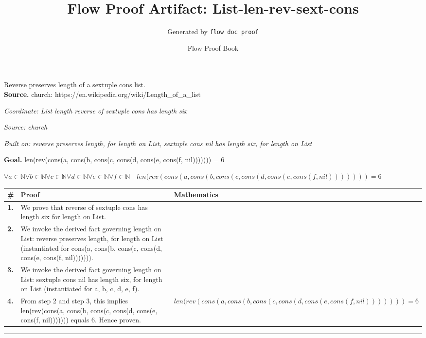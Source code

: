 \documentclass[11pt]{article}
\title{Flow Proof Artifact: List-len-rev-sext-cons}
\author{Generated by \texttt{flow doc proof}}
\date{Flow Proof Book}
\theoremstyle{definition}
\begin{document}
\maketitle
Reverse preserves length of a sextuple cons list.\\[0.5em]
\textbf{Source.} church: https://en.wikipedia.org/wiki/Length\_of\_a\_list\\[0.5em]
\bigskip
{}\par
\smallskip\noindent\textit{Coordinate: List \cdot length \cdot reverse of sextuple cons has length six}\par
\smallskip\noindent\textit{Source: church}\par
\smallskip\noindent\textit{Built on: reverse preserves length, for length on List, sextuple cons nil has length six, for length on List}\par
\medskip
\noindent\textbf{Goal.} len(rev(cons(a, cons(b, cons(c, cons(d, cons(e, cons(f, nil))))))) = 6\par
\noindent$\displaystyle \forall a \in \mathbb{N} \forall b \in \mathbb{N} \forall c \in \mathbb{N} \forall d \in \mathbb{N} \forall e \in \mathbb{N} \forall f \in \mathbb{N}\quad len(rev(cons(a, cons(b, cons(c, cons(d, cons(e, cons(f, nil))))))) = 6$\par
\medskip
\noindent
\begin{tabular}{@{} >{\raggedright\arraybackslash}p{} >{\raggedright\arraybackslash}p{} >{\raggedleft\arraybackslash}p{} @{}}
\textbf{\#} & \textbf{Proof} & \textbf{Mathematics} \\
\midrule
\textbf{1.} & We prove that reverse of sextuple cons has length six for length on List. & \\[0.45em]
\textbf{2.} & We invoke the derived fact governing length on List: reverse preserves length, for length on List (instantiated for cons(a, cons(b, cons(c, cons(d, cons(e, cons(f, nil))))))). & \\[0.45em]
\textbf{3.} & We invoke the derived fact governing length on List: sextuple cons nil has length six, for length on List (instantiated for a, b, c, d, e, f). & \\[0.45em]
\textbf{4.} & From step 2 and step 3, this implies len(rev(cons(a, cons(b, cons(c, cons(d, cons(e, cons(f, nil))))))) equals 6. Hence proven. & $\displaystyle len(rev(cons(a, cons(b, cons(c, cons(d, cons(e, cons(f, nil))))))) = 6$ \\[0.45em]
\bottomrule
\end{tabular}
\label{thm:List-length-reverse_of_sextuple_cons_has_length_six}
\par\medskip\hrule
\end{document}
